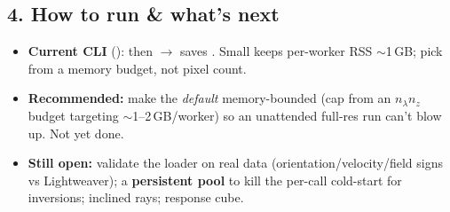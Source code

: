 \subsection*{4. How to run \& what's next}
\begin{itemize}
  \item \textbf{Current CLI} ():  then
         $\to$ saves .
        Small  keeps per-worker RSS $\sim$1\,GB; pick  from a memory budget, not pixel count.
  \item \textbf{Recommended:} make the \emph{default}  memory-bounded (cap from an $n_\lambda n_z$
        budget targeting $\sim$1--2\,GB/worker) so an unattended full-res run can't blow up. Not yet done.
  \item \textbf{Still open:} validate the loader on real data (orientation/velocity/field signs vs Lightweaver);
        a \textbf{persistent pool} to kill the per-call cold-start for inversions; inclined rays; response cube.
\end{itemize}



